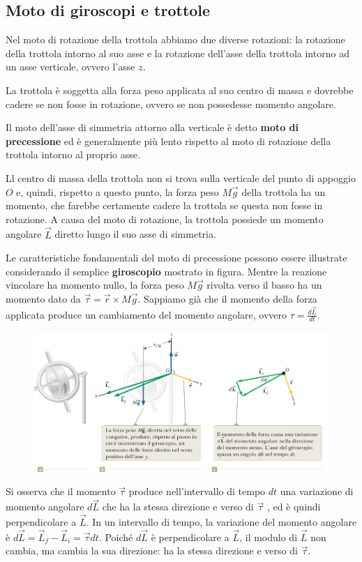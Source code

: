 \documentclass[a4paper,11pt,oneside]{book}
\begin{document}
\subsection{Moto di giroscopi e trottole}
Nel moto di rotazione della trottola abbiamo due diverse rotazioni: la rotazione della trottola intorno al suo asse e la rotazione dell'asse della trottola
intorno ad un asse verticale, ovvero l'asse $z$.

La trottola è soggetta alla forza peso applicata al suo centro di massa e dovrebbe cadere se non fosse in rotazione, ovvero se non possedesse momento angolare.

Il moto dell’asse di simmetria attorno alla verticale è detto \textbf{moto di precessione} ed è generalmente più lento rispetto al moto di rotazione della trottola intorno al proprio asse.

Ll centro di massa della trottola non si trova sulla verticale del punto di appoggio $O$ e, quindi, rispetto a questo punto, la forza peso $M\vec{g}$ della 
trottola ha un momento, che farebbe certamente cadere la trottola se questa non fosse in rotazione. A causa del moto di rotazione, la trottola possiede un momento angolare $\vec{L}$ diretto lungo il suo asse di simmetria.

Le caratteristiche fondamentali del moto di precessione possono essere illustrate considerando il semplice \textbf{giroscopio} mostrato in figura.
Mentre la reazione vincolare ha momento nullo, la forza peso $M\vec{g}$ rivolta verso il basso ha un momento dato da $\vec{\tau} = \vec{r} \times M \vec{g}$.
Sappiamo già che il momento della forza applicata produce un cambiamento del momento angolare, ovvero $\tau = \tfrac{d\vec{L}}{dt}$.
\begin{figure}[h]
    \includegraphics[scale=0.6]{giroscopio_momento.png}
    \centering
\end{figure}

Si osserva che il momento $\vec{\tau}$ produce nell’intervallo di tempo $dt$ una variazione di momento angolare $d\vec{L}$ che ha la stessa direzione e 
verso di $\vec{\tau}$ , ed è quindi perpendicolare a $\vec{L}$. In un intervallo di tempo, la variazione del momento angolare è $d\vec{L} = \vec{L}_f - \vec{L}_i = \vec{\tau}dt$.
Poiché $d\vec{L}$ è perpendicolare a $\vec{L}$, il modulo di $\vec{L}$ non cambia, ma cambia la sua direzione: ha la stessa direzione e verso di $\vec{\tau}$.
\end{document}
